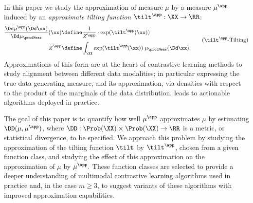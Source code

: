 \documentclass{article}
\begin{document}
In this paper we study the approximation of measure $\mu$ by a measure
$\mu^\app$ induced by an \emph{approximate tilting function} $\tilt^\app:
 \XX \to \RR$:
\begin{align}
 \begin{aligned}
  \frac{\Dd\mu^\app(\Dd \xx)}{\Dd \mu_\prodMeas} (\xx) & \define \frac{1}{Z^\app} \cdot
  \exp(\tilt^\app(\xx))                                                                 \\
  Z^\app                                               & \define \int_{\XX}
  \exp(\tilt^\app(\xx)) \;\mu_\prodMeas(\Dd \xx).
 \end{aligned}
 \tag{\ensuremath{\tilt^\app}-Tilting}
 \label{eq:GeneralTiltingFunction}
\end{align}
Approximations of this form are at the heart of contrastive learning
methods to study alignment between different data modalities; in particular
expressing the true data generating measure, and its approximation, via
densities with respect to the product of the marginals of the data
distribution, leads to actionable algorithms deployed in practice.


The goal of this paper is to quantify how well $\mu^\app$ approximates
$\mu$ by estimating $\DD(\mu,\mu^\app)$, where
$\DD:\Prob(\XX)\times\Prob(\XX)\to\RR$ is a metric, or statistical
divergence, to be specified. We approach this problem by studying the
approximation of the tilting function $\tilt$ by $\tilt^\app$, chosen from
a given function class, and studying the effect of this approximation on
the approximation of $\mu$ by $\mu^\app.$ These function classes are
selected to provide a deeper understanding of multimodal contrastive
learning algorithms used in practice and, in the case $m\geq 3$, to suggest
variants of these algorithms with improved approximation capabilities.
\end{document}
